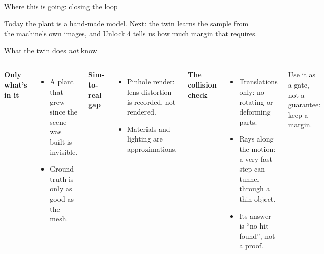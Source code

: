 \documentclass[aspectratio=169,11pt]{beamer}
\begin{document}
\begin{frame}{Where this is going: closing the loop}
\centering
{}

\vspace{2mm}
\small Today the plant is a hand-made model. Next: the twin learns the sample from the machine's own
images, and Unlock 4 tells us how much margin that requires.
\end{frame}

\begin{frame}{What the twin does \emph{not} know}
\begin{columns}[t]
\textbf{Only what's in it}
\begin{itemize}\small
  \item A plant that grew since the scene was built is invisible.
  \item Ground truth is only as good as the mesh.
\end{itemize}
\vspace{2mm}
\textbf{Sim-to-real gap}
\begin{itemize}\small
  \item Pinhole render: lens distortion is recorded, not rendered.
  \item Materials and lighting are approximations.
\end{itemize}
\textbf{The collision check}
\begin{itemize}\small
  \item Translations only: no rotating or deforming parts.
  \item Rays along the motion: a very fast step can tunnel through a thin object.
  \item Its answer is ``no hit found'', not a proof.
\end{itemize}
\vspace{2mm}
\alert{Use it as a gate, not a guarantee: keep a margin.}
\end{columns}
\end{frame}
\end{document}
